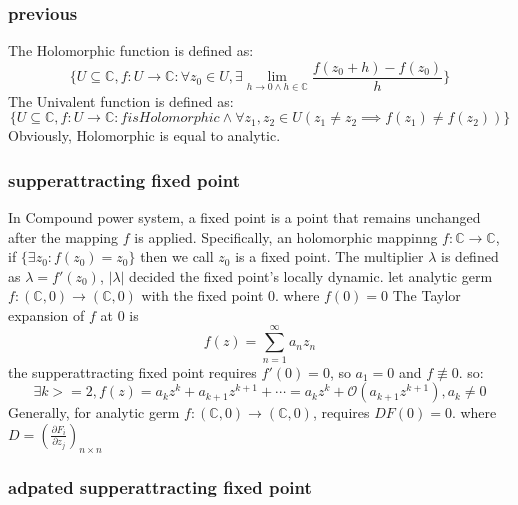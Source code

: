 \documentclass[10pt,a4paper]{article}
\begin{document}
\subsubsection{previous}
The Holomorphic function is defined as:
\[\{U\subseteq\mathbb{C},f:U\to\mathbb{C}:\forall z_0\in U,\exists\lim_{h\to0\land h\in\mathbb{C}}\frac{f(z_0+h)-f(z_0)}{h}\}\]
The Univalent function is defined as:
\[\{U\subseteq\mathbb{C},f:U\to\mathbb{C}:f is Holomorphic\land\forall z_1,z_2\in U(z_1\ne z_2\implies f(z_1)\ne f(z_2))\}\]
Obviously, Holomorphic is equal to analytic.\\
\subsubsection{supperattracting fixed point}
In Compound power system, a fixed point is a point that remains unchanged after the mapping $f$ is applied. Specifically, an holomorphic mappinng
$f:\mathbb{C}\to\mathbb{C}$, if $\{\exists z_0:f(z_0)=z_0\}$ then we call $z_0$ is a fixed point. The multiplier $\lambda$ is defined as $\lambda=f'(z_0)$,
$|\lambda|$ decided the fixed point's locally dynamic.
let analytic germ $f:(\mathbb{C},0)\to(\mathbb{C},0)$ with the fixed point 0. where $f(0)=0$
The Taylor expansion of $f$ at 0 is \[f(z)=\sum\limits_{n=1}^{\infty}a_nz_n\]
the supperattracting fixed point requires $f'(0)=0$, so $a_1=0$ and $f\not\equiv0$. so:
\[\exists k>=2,f(z)=a_kz^{k}+a_{k+1}z^{k+1}+\cdots=a_kz^k+\mathcal{O}(a_{k+1}z^{k+1}),a_k\ne0\]
Generally, for analytic germ $f:(\mathbb{C},0)\to(\mathbb{C},0)$, requires $DF(0)=0$. where $D=(\frac{\partial{F_i}}{\partial{z_j}})_{n\times n}$
\subsubsection{adpated supperattracting fixed point}
\end{document}
